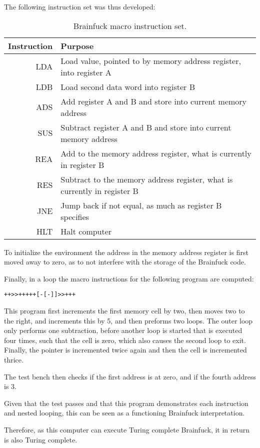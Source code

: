 The following instruction set was thus developed:
\begin{table}[H]
    \begin{center}
    \begin{tabular}{rl}
    Instruction & Purpose                                                                  \\ \hline
    LDA         & Load value, pointed to by memory address register, into register A       \\
    LDB         & Load second data word into register B                                    \\
    ADS         & Add register A and B and store into current memory address               \\
    SUS         & Subtract register A and B and store into current memory address          \\
    REA         & Add to the memory address register, what is currently in register B      \\
    RES         & Subtract to the memory address register, what is currently in register B \\
    JNE         & Jump back if not equal, as much as register B specifies                  \\
    HLT         & Halt computer                                                           
    \end{tabular}
\end{center}
    \caption{Brainfuck macro instruction set.}
    \label{tab:brainfuck-macro-instructions}
    \end{table}

To initialize the environment the address in the memory address register is first moved away to zero, as to not interfere with the storage of the Brainfuck code.

Finally, in a loop the macro instructions for the following program are computed: 

\begin{lstlisting}[caption=Brainfuck program, label=lst:brainfuck]
    ++>>+++++[-[-]]>>+++
\end{lstlisting}

This program first increments the first memory cell by two, then moves two to the right, and increments this by 5, and then preforms two loops. The outer loop only performs one subtraction, before another loop is started that is executed four times, such that the cell is zero, which also causes the second loop to exit. Finally, the pointer is incremented twice again and then the cell is incremented thrice. 

The test bench then checks if the first address is at zero, and if the fourth address is 3.

Given that the test passes and that this program demonstrates each instruction and nested looping, this can be seen as a functioning Brainfuck interpretation.

Therefore, as this computer can execute Turing complete Brainfuck, it in return is also Turing complete.